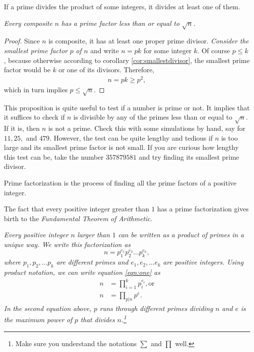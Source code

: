\documentclass{subfile}
\begin{document}
	\begin{corollary}\label{cor:euclidgeneral}
		If a prime divides the product of some integers, it divides at least one of them.
	\end{corollary}

	\begin{proposition}\slshape\label{factorsqrt}
		Every composite $n$ has a prime factor less than or equal to $\sqrt{n}$.
	\end{proposition}

	\begin{proof}
		Since $n$ is composite, it has at least one proper prime divisor. {\it Consider the smallest prime factor $p$ of $n$} and write $n=pk$ for some integer $k$. Of course $p\leq k$, because otherwise according to corollary \eqref{cor:smallestdivisor}, the smallest prime factor would be $k$ or one of its divisors. Therefore,
		\begin{align*}
			n=pk\geq p^2,
		\end{align*}
		which in turn implies $p\leq \sqrt{n}$.
	\end{proof}

	This proposition is quite useful to test if a number is prime or not. It implies that it suffices to check if $n$ is divisible by any of the primes less than or equal to $\sqrt{n}$. If it is, then $n$ is not a prime. Check this with some simulations by hand, say for $11,25,$ and $479$. However, the test can be quite lengthy and tedious if $n$ is too large and its smallest prime factor is not small. If you are curious how lengthy this test can be, take the number $357879581$ and try finding its smallest prime divisor.

	\begin{definition}
		Prime factorization is the process of finding all the prime factors of a positive integer.
	\end{definition}

	The fact that every positive integer greater than $1$ has a prime factorization gives birth to the \textit{Fundamental Theorem of Arithmetic}.

	\begin{theorem}\slshape
		Every positive integer $n$ larger than $1$ can be written as a product of primes \textit{in a unique way}. We write this factorization as
		\begin{equation}
			n=p_1^{e_1}p_2^{e_2}\dots p_k^{e_k},\label{eqn:one}
		\end{equation}
		where $p_1,p_2,\dots p_k$ are different primes and $e_1,e_2,\dots e_k$ are positive integers. Using product notation, we can write equation \eqref{eqn:one} as
		\begin{align*}
			n &=\prod\limits_{i=1}^{k}p_i^{e_i}, \text{or}\\
			n  &=\prod\limits_{p|n}p^e.
		\end{align*}
		In the second equation above, $p$ runs through different primes dividing $n$ and $e$ is the maximum power of $p$ that divides $n$.\footnote{Make sure you understand the notations $\sum$ and $\prod$ well.}
	\end{theorem}
\end{document}
